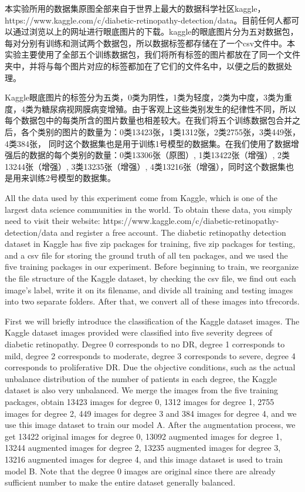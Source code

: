 \documentclass{ijisa}
\begin{document}
本实验所用的数据集原图全部来自于世界上最大的数据科学社区kaggle，https://www.kaggle.com/c/diabetic-retinopathy-detection/data。目前任何人都可以通过浏览以上的网址进行眼底图片的下载。kaggle的眼底图片分为五对数据包，每对分别有训练和测试两个数据包，所以数据标签都存储在了一个csv文件中。本实验主要使用了全部五个训练数据包，我们将所有标签的图片都放在了同一个文件夹中，并将与每个图片对应的标签都加在了它们的文件名中，以便之后的数据处理。

Kaggle眼底图片的标签分为五类，0类为阴性，1类为轻度，2类为中度，3类为重度，4类为糖尿病视网膜病变增殖。由于客观上这些类别发生的纪律性不同，所以每个数据包中的每类所含的图片数量也相差较大。在我们将五个训练数据包合并之后，各个类别的图片的数量为：0类13423张，1类1312张，2类2755张，3类449张，4类384张， 同时这个数据集也是用于训练1号模型的数据集。在我们使用了数据增强后的数据的每个类别的数量：0类13306张（原图）, 1类13422张（增强）, 2类13244张（增强）, 3类13235张（增强）, 4类13216张（增强），同时这个数据集也是用来训练2号模型的数据集。

All the data used by this experiment come from Kaggle, which is one of the largest data science communities in the world. To obtain these data, you simply need to visit their website: https://www.kaggle.com/c/diabetic-retinopathy-detection/data and register a free account. The diabetic retinopathy detection dataset in Kaggle has five zip packages for training, five zip packages for testing, and a csv file for storing the ground truth of all ten packages, and we used the five training packages in our experiment. Before beginning to train, we reorganize the file structure of the Kaggle dataset, by checking the csv file, we find out each image's label, write it on its filename, and divide all training and testing images into two separate folders. After that, we convert all of these images into tfrecords. 

First we will briefly introduce the classification of the Kaggle dataset images. The Kaggle dataset images provided were classified into five severity degrees of diabetic retinopathy. Degree 0 corresponds to no DR, degree 1 corresponds to mild, degree 2 corresponds to moderate, degree 3 corresponds to severe, degree 4 corresponds to proliferative DR. Due the objective conditions, such as the actual unbalance distribution of the number of patients in each degree, the Kaggle dataset is also very unbalanced. We 
merge the images from the five training packages, obtain 13423 images for degree 0, 1312 images for degree 1, 2755 images for degree 2, 449 images for degree 3 and 384 images for degree 4, and we use this image dataset to train our model A. After the augmentation process, we get 13422 original images for degree 0, 13092 augmented images for degree 1, 13244 augmented images for degree 2, 13235 augmented images for degree 3, 13216 augmented images for degree 4, and this image dataset is used to train model B. Note that the degree 0 images are original since there are already sufficient number to make the entire dataset generally balanced. 
\end{document}
